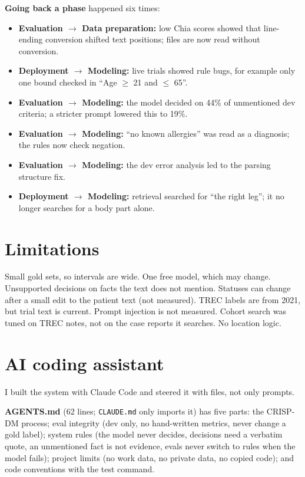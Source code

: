 \documentclass[11pt,a4paper]{article}
\begin{document}
\textbf{Going back a phase} happened six times:
\begin{itemize}
  \item \textbf{Evaluation $\to$ Data preparation:} low Chia scores showed that line-ending conversion shifted text positions; files are now read without conversion.
  \item \textbf{Deployment $\to$ Modeling:} live trials showed rule bugs, for example only one bound checked in ``Age $\geq$ 21 and $\leq$ 65''.
  \item \textbf{Evaluation $\to$ Modeling:} the model decided on 44\% of unmentioned dev criteria; a stricter prompt lowered this to 19\%.
  \item \textbf{Evaluation $\to$ Modeling:} ``no known allergies'' was read as a diagnosis; the rules now check negation.
  \item \textbf{Evaluation $\to$ Modeling:} the dev error analysis led to the parsing structure fix.
  \item \textbf{Deployment $\to$ Modeling:} retrieval searched for ``the right leg''; it no longer searches for a body part alone.
\end{itemize}

\section{Limitations}

Small gold sets, so intervals are wide. One free model, which may change. Unsupported decisions on facts the text does not mention. Statuses can change after a small edit to the patient text (not measured). TREC labels are from 2021, but trial text is current. Prompt injection is not measured. Cohort search was tuned on TREC notes, not on the case reports it searches. No location logic.

\section{AI coding assistant}

I built the system with Claude Code and steered it with files, not only prompts.

\textbf{AGENTS.md} (62 lines; \texttt{CLAUDE.md} only imports it) has five parts: the CRISP-DM process; eval integrity (dev only, no hand-written metrics, never change a gold label); system rules (the model never decides, decisions need a verbatim quote, an unmentioned fact is not evidence, evals never switch to rules when the model fails); project limits (no work data, no private data, no copied code); and code conventions with the test command.
\end{document}
